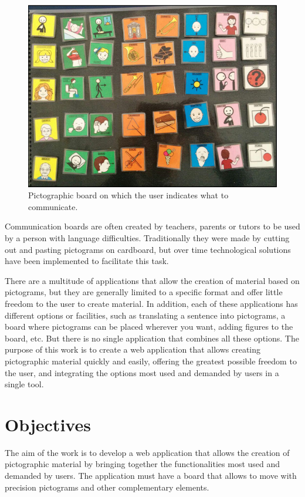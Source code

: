 \begin{figure}[h!]
	\centering
	\includegraphics[width=0.7\linewidth]{Imagenes/Bitmap/tablerofisico}
	\caption{Pictographic board on which the user indicates what to communicate.}
	\label{fig:physicalboard}
\end{figure}


Communication boards are often created by teachers, parents or tutors to be used by a person with language difficulties. Traditionally they were made by cutting out and pasting pictograms on cardboard, but over time technological solutions have been implemented to facilitate this task. 

There are a multitude of applications that allow the creation of material based on pictograms, but they are generally limited to a specific format and offer little freedom to the user to create material. In addition, each of these applications has different options or facilities, such as translating a sentence into pictograms, a board where pictograms can be placed wherever you want, adding figures to the board, etc. But there is no single application that combines all these options. 
The purpose of this work is to create a web application that allows creating pictographic material quickly and easily, offering the greatest possible freedom to the user, and integrating the options most used and demanded by users in a single tool. 

\section{Objectives}
\label{cap1:sec:Objectives}



The aim of the work is to develop a web application that allows the creation of pictographic material by bringing together the functionalities most used and demanded by users. The application must have a board that allows to move with precision pictograms and other complementary elements.

